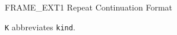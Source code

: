 \begin{manuallistedformatdiagram}{FRAME\_EXT1 Repeat Continuation Format}
\end{manuallistedformatdiagram}
{\small\texttt{K} abbreviates \texttt{kind}.\par}

